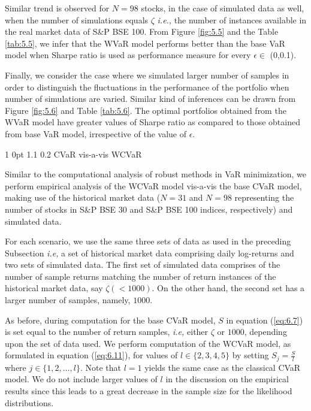 \documentclass[12pt]{article}
\makeatletter
\numberwithin{equation}{section}
\renewcommand{\subsection}{
  \@startsection
  {subsection}%
  {1}%
  {0pt}%
  {1.1\baselineskip}%
  {0.2\baselineskip}%
  {\sc \centering}%
}
\makeatother
\begin{document}
Similar trend is observed for $N=98$ stocks, in the case of simulated data as well, when the number of simulations equals $\zeta$ \textit{i.e.,} the number of instances available in the real market data of S\&P BSE 100. From Figure \ref{fig:5.5} and the Table \ref{tab:5.5}, we infer that the WVaR model performs better than the base VaR model when Sharpe ratio is used as performance measure for every $\epsilon \in$ (0,0.1).

Finally, we consider the case where we simulated larger number of samples in order to distinguish the fluctuations in the performance of the portfolio when number of simulations are varied. Similar kind of inferences can be drawn from Figure \ref{fig:5.6} and Table \ref{tab:5.6}. The optimal portfolios obtained from the WVaR model have greater values of Sharpe ratio as compared to those obtained from base VaR model, irrespective of the value of $\epsilon$.

\subsection{CVaR vis-a-vis WCVaR}

Similar to the computational analysis of robust methods in VaR minimization, we perform empirical analysis of the WCVaR  model vis-a-vis the base CVaR model, making use of the historical market data ($N=31$ and $N=98$ representing the number of stocks in S\&P BSE 30 and S\&P BSE 100 indices, respectively) and simulated data.

For each scenario, we use the same three sets of data as used in the preceding Subsection \textit{i.e,} a set of historical market data comprising daily log-returns and two sets of simulated data. The first set of simulated data comprises of the number of sample returns matching the number of return instances of the historical market data, say $\zeta (<1000)$. On the other hand, the second set has a larger number of samples, namely, $1000$.

As before, during computation for the base CVaR model, $S$ in equation (\ref{eq:6.7}) is set equal to the number of return samples, \textit{i.e,} either $\zeta$ or $1000$, depending upon the set of data used. We perform computation of the WCVaR model, as formulated in equation (\ref{eq:6.11}), for values of $l \in \{2,3,4,5\}$ by setting $\displaystyle{S_{j}=\frac{S}{l}}$ where $\displaystyle{j \in \{1,2,\dots,l\}}$. Note that $l=1$ yields the same case as the classical CVaR model. We do not include larger values of $l$ in the discussion on the empirical results since this leads to a great decrease in the sample size for the likelihood distributions.
\end{document}
